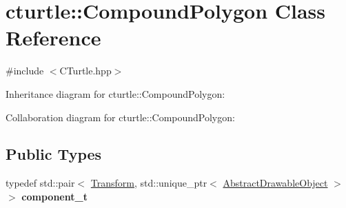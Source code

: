 \hypertarget{classcturtle_1_1CompoundPolygon}{}\section{cturtle\+:\+:Compound\+Polygon Class Reference}
\label{classcturtle_1_1CompoundPolygon}


{\ttfamily \#include $<$C\+Turtle.\+hpp$>$}



Inheritance diagram for cturtle\+:\+:Compound\+Polygon\+:


Collaboration diagram for cturtle\+:\+:Compound\+Polygon\+:
\subsection*{Public Types}
\begin{DoxyCompactItemize}
\item 
\mbox{\label{classcturtle_1_1CompoundPolygon_a10c24e9f65b586dec2c4173d2e4ddc2a}} 
typedef std\+::pair$<$ \hyperlink{classcturtle_1_1Transform}{Transform}, std\+::unique\+\_\+ptr$<$ \hyperlink{classcturtle_1_1AbstractDrawableObject}{Abstract\+Drawable\+Object} $>$ $>$ {\bfseries component\+\_\+t}
\end{DoxyCompactItemize}
